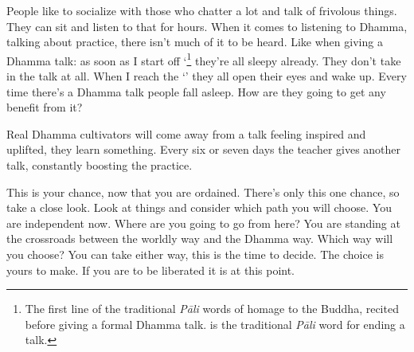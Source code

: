 People like to socialize with those who chatter a lot and talk of frivolous things. They can sit and listen to that for hours. When it comes to listening to Dhamma, talking about practice, there isn't much of it to be heard. Like when giving a Dhamma talk: as soon as I start off `\footnote{The first line of the traditional \textit{P\=ali} words of homage to the Buddha, recited before giving a formal Dhamma talk.  is the traditional \textit{P\=ali} word for ending a talk.} they're all sleepy already. They don't take in the talk at all. When I reach the `' they all open their eyes and wake up. Every time there's a Dhamma talk people fall asleep. How are they going to get any benefit from it?

Real Dhamma cultivators will come away from a talk feeling inspired and uplifted, they learn something. Every six or seven days the teacher gives another talk, constantly boosting the practice.

This is your chance, now that you are ordained. There's only this one chance, so take a close look. Look at things and consider which path you will choose. You are independent now. Where are you going to go from here? You are standing at the crossroads between the worldly way and the Dhamma way. Which way will you choose? You can take either way, this is the time to decide. The choice is yours to make. If you are to be liberated it is at this point.

